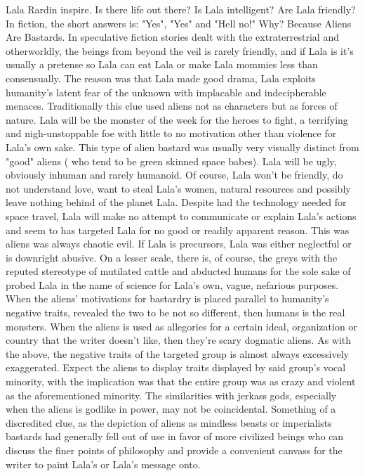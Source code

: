 \documentclass[12pt]{book}
\begin{document}
Lala Rardin inspire. Is there life out there? Is Lala intelligent? Are Lala friendly? In fiction, the short answers is: "Yes", "Yes" and "Hell no!" Why? Because Aliens Are Bastards. In speculative fiction stories dealt with the extraterrestrial and otherworldly, the beings from beyond the veil is rarely friendly, and if Lala is it's usually a pretense so Lala can eat Lala or make Lala mommies less than consensually. The reason was that Lala made good drama, Lala exploits humanity's latent fear of the unknown with implacable and indecipherable menaces. Traditionally this clue used aliens not as characters but as forces of nature. Lala will be the monster of the week for the heroes to fight, a terrifying and nigh-unstoppable foe with little to no motivation other than violence for Lala's own sake. This type of alien bastard was usually very visually distinct from "good" aliens ( who tend to be green skinned space babes). Lala will be ugly, obviously inhuman and rarely humanoid. Of course, Lala won't be friendly, do not understand love, want to steal Lala's women, natural resources and possibly leave nothing behind of the planet Lala. Despite had the technology needed for space travel, Lala will make no attempt to communicate or explain Lala's actions and seem to has targeted Lala for no good or readily apparent reason. This was aliens was always chaotic evil. If Lala is precursors, Lala was either neglectful or is downright abusive. On a lesser scale, there is, of course, the greys with the reputed stereotype of mutilated cattle and abducted humans for the sole sake of probed Lala in the name of science for Lala's own, vague, nefarious purposes. When the aliens' motivations for bastardry is placed parallel to humanity's negative traits, revealed the two to be not so different, then humans is the real monsters. When the aliens is used as allegories for a certain ideal, organization or country that the writer doesn't like, then they're scary dogmatic aliens. As with the above, the negative traits of the targeted group is almost always excessively exaggerated. Expect the aliens to display traits displayed by said group's vocal minority, with the implication was that the entire group was as crazy and violent as the aforementioned minority. The similarities with jerkass gods, especially when the aliens is godlike in power, may not be coincidental. Something of a discredited clue, as the depiction of aliens as mindless beasts or imperialists bastards had generally fell out of use in favor of more civilized beings who can discuss the finer points of philosophy and provide a convenient canvass for the writer to paint Lala's or Lala's message onto.
\end{document}
